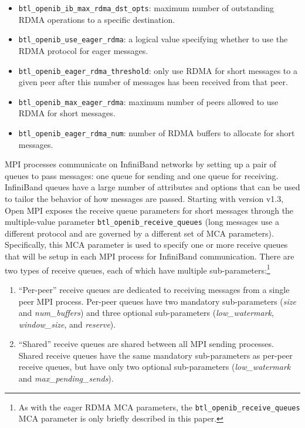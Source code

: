 \begin{itemize}
\item {\tt btl\_\-openib\_\-ib\_\-max\_\-rdma\_\-dst\_\-opts}: maximum
  number of outstanding RDMA operations to a specific destination.
\item {\tt btl\_\-openib\_\-use\_\-eager\_\-rdma}: a logical value
  specifying whether to use the RDMA protocol for eager messages.
\item {\tt btl\_\-openib\_\-eager\_\-rdma\_\-threshold}: only use RDMA
  for short messages to a given peer after this number of messages has
  been received from that peer.
\item {\tt btl\_\-openib\_\-max\_\-eager\_\-rdma}: maximum number of
  peers allowed to use RDMA for short messages.
\item {\tt btl\_\-openib\_\-eager\_\-rdma\_\-num}: number of RDMA
  buffers to allocate for short messages.
\end{itemize}

MPI processes communicate on InfiniBand networks by setting up a pair
of queues to pass messages: one queue for sending and one queue for
receiving.  InfiniBand queues have a large number of attributes and
options that can be used to tailor the behavior of how messages are
passed.  Starting with version v1.3, Open MPI exposes the receive
queue parameters for short messages through the multiple-value
parameter {\tt btl\_\-openib\_\-receive\_\-queues} (long messages use
a different protocol and are governed by a different set of MCA
parameters).  Specifically, this MCA parameter is used to specify one
or more receive queues that will be setup in each MPI process for
InfiniBand communication.  There are two types of receive queues, each
of which have multiple sub-parameters:\footnote{As with the eager RDMA
  MCA parameters, the {\tt btl\_\-openib\_\-receive\_\-queues} MCA
  parameter is only briefly described in this paper.}

\begin{enumerate}
\item ``Per-peer'' receive queues are dedicated to receiving messages
  from a single peer MPI process. Per-peer queues have two mandatory
  sub-parameters ({\em size} and {\em num\_\-buffers}) and three
  optional sub-parameters ({\em low\_\-watermark}, {\em
    window\_\-size}, and {\em reserve}).

\item ``Shared'' receive queues are shared between all MPI sending
  processes. Shared receive queues have the same mandatory
  sub-parameters as per-peer receive queues, but have only two
  optional sub-parameters ({\em low\_\-watermark} and {\em
    max\_\-pending\_\-sends}).
\end{enumerate}


